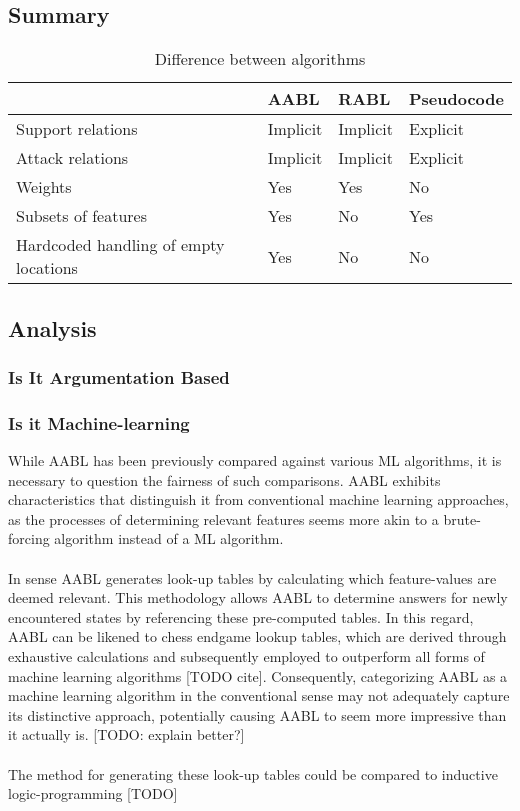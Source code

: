 \documentclass{article}
\begin{document}
\subsection{Summary}
\begin{table}[H]
\begin{center}
\caption{Difference between algorithms}
\label{tab:comparison}
\begin{tabular}{|l|l|l|l|}
\hline
                                      & AABL     & RABL     & Pseudocode \\ \hline
Support relations                     & Implicit & Implicit & Explicit   \\ \hline
Attack relations                      & Implicit & Implicit & Explicit   \\ \hline
Weights                               & Yes      & Yes      & No         \\ \hline
Subsets of features                   & Yes      & No       & Yes        \\ \hline
Hardcoded handling of empty locations & Yes      & No       & No         \\ \hline
\end{tabular}
\end{center}
\end{table}

\subsection{Analysis}
\subsubsection{Is It Argumentation Based}
\subsubsection{Is it Machine-learning}
While AABL has been previously compared against various ML algorithms, it is necessary to question the fairness of such comparisons. AABL exhibits characteristics that distinguish it from conventional machine learning approaches, as the processes of determining relevant features seems more akin to a brute-forcing algorithm instead of a ML algorithm. 
\\\\
In sense AABL generates look-up tables by calculating which feature-values are deemed relevant. This methodology allows AABL to determine answers for newly encountered states by referencing these pre-computed tables. In this regard, AABL can be likened to chess endgame lookup tables, which are derived through exhaustive calculations and subsequently employed to outperform all forms of machine learning algorithms [TODO cite]. Consequently, categorizing AABL as a machine learning algorithm in the conventional sense may not adequately capture its distinctive approach, potentially causing AABL to seem more impressive than it actually is. [TODO: explain better?]
\\\\
The method for generating these look-up tables could be compared to inductive logic-programming [TODO]
\end{document}
